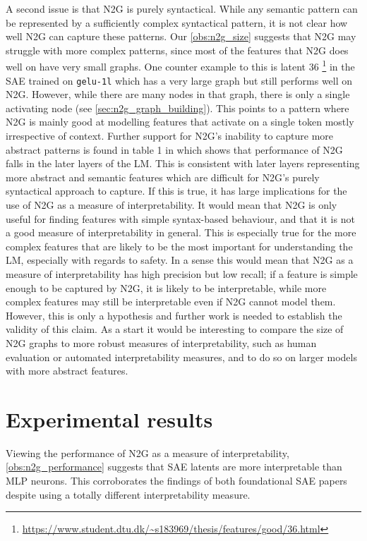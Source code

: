 A second issue is that \ac{N2G} is purely syntactical.
While any semantic pattern can be represented by a sufficiently complex syntactical pattern, it is not clear how well \ac{N2G} can capture these patterns.
Our \ref{obs:n2g_size} suggests that \ac{N2G} may struggle with more complex patterns, since most of the features that N2G does well on have very small graphs.
One counter example to this is latent $36$ \footnote{\url{https://www.student.dtu.dk/~s183969/thesis/features/good/36.html}} in the \ac{SAE} trained on \texttt{gelu-1l} which has a very large graph but still performs well on \ac{N2G}.
However, while there are many nodes in that graph, there is only a single activating node (see \autoref{sec:n2g_graph_building}).
This points to a pattern where \ac{N2G} is mainly good at modelling features that activate on a single token mostly irrespective of context.
Further support for \ac{N2G}'s inability to capture more abstract patterns is found in table 1 in \textcite{foote_neuron_2023} which shows that performance of \ac{N2G} falls in the later layers of the \ac{LM}.
This is consistent with later layers representing more abstract and semantic features which are difficult for \ac{N2G}'s purely syntactical approach to capture.
If this is true, it has large implications for the use of \ac{N2G} as a measure of interpretability.
It would mean that \ac{N2G} is only useful for finding features with simple syntax-based behaviour, and that it is not a good measure of interpretability in general.
This is especially true for the more complex features that are likely to be the most important for understanding the \ac{LM}, especially with regards to safety.
In a sense this would mean that \ac{N2G} as a measure of interpretability has high precision but low recall; if a feature is simple enough to be captured by \ac{N2G}, it is likely to be interpretable, while more complex features may still be interpretable even if \ac{N2G} cannot model them.
However, this is only a hypothesis and further work is needed to establish the validity of this claim.
As a start it would be interesting to compare the size of \ac{N2G} graphs to more robust measures of interpretability, such as human evaluation or automated interpretability measures, and to do so on larger models with more abstract features.


\section{Experimental results}
\label{sec:discussion_results}
Viewing the performance of \ac{N2G} as a measure of interpretability, \ref{obs:n2g_performance} suggests that \ac{SAE} latents are more interpretable than \ac{MLP} neurons.
This corroborates the findings of both foundational \ac{SAE} papers \parencite{bricken_towards_2023}\parencite{cunningham_sparse_2023} despite using a totally different interpretability measure.



